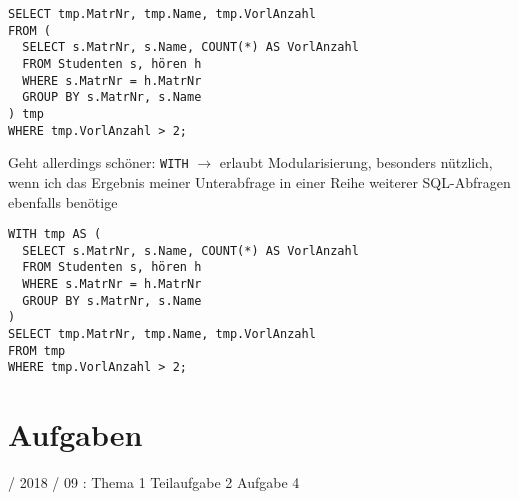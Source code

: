 \documentclass{lehramt-informatik-haupt}
\begin{document}
\begin{verbatim}
SELECT tmp.MatrNr, tmp.Name, tmp.VorlAnzahl
FROM (
  SELECT s.MatrNr, s.Name, COUNT(*) AS VorlAnzahl
  FROM Studenten s, hören h
  WHERE s.MatrNr = h.MatrNr
  GROUP BY s.MatrNr, s.Name
) tmp
WHERE tmp.VorlAnzahl > 2;
\end{verbatim}

\noindent
Geht allerdings schöner: \verb|WITH| $\rightarrow$ erlaubt
Modularisierung, besonders nützlich, wenn ich das Ergebnis meiner
Unterabfrage in einer Reihe weiterer SQL-Abfragen ebenfalls benötige

\begin{verbatim}
WITH tmp AS (
  SELECT s.MatrNr, s.Name, COUNT(*) AS VorlAnzahl
  FROM Studenten s, hören h
  WHERE s.MatrNr = h.MatrNr
  GROUP BY s.MatrNr, s.Name
)
SELECT tmp.MatrNr, tmp.Name, tmp.VorlAnzahl
FROM tmp
WHERE tmp.VorlAnzahl > 2;
\end{verbatim}


\chapter{Aufgaben}

%

 / 2018 / 09 : Thema 1 Teilaufgabe 2 Aufgabe 4

\literatur
\end{document}
